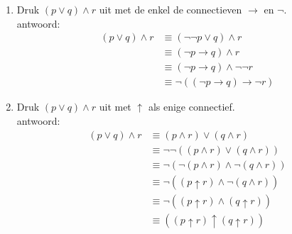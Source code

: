\begin{answer}\mbox{} %
\begin{enumerate}[label=\textit{\alph*.}]
\item Druk $(p\lor q)\land r$ uit met de enkel de connectieven $\rightarrow$ en $\neg$. \\
antwoord:
\begin{align}
(p\lor q)\land r &\equiv (\neg \neg p \vee q) \wedge r \tag{St-2.3.2: 1}\\
&\equiv (\neg p\rightarrow q) \wedge r \tag{St-2.3.2: 7}\\
&\equiv (\neg p\rightarrow q)\wedge \neg \neg r \tag{St-2.3.2: 1}\\
&\equiv \neg ((\neg p\rightarrow q) \rightarrow \neg r) \tag{St-2.3.2: 8}
\end{align}
\item Druk $(p\lor q)\land r$ uit met $\uparrow$ als enige connectief. \\
antwoord:
\begin{align}
(p\vee q)\wedge r &\equiv (p \wedge r) \vee (q \wedge r) \tag{St-2.3.2: 11}\\
&\equiv \neg \neg ((p\wedge r) \vee (q\wedge r)) \tag{St-2.3.2: 1}\\
&\equiv \neg (\neg (p\wedge r) \wedge \neg (q\wedge r)) \tag{St-2.3.2: 9}\\
&\equiv \neg ((p\uparrow r) \wedge \neg (q \wedge r)) \tag{Sheffer stroke}\\
&\equiv \neg ((p\uparrow r) \wedge (q \uparrow r)) \tag{Sheffer stroke}\\
&\equiv ((p\uparrow r) \uparrow (q \uparrow r)) \tag{Sheffer stroke}
\end{align}
\end{enumerate}
\end{answer}

